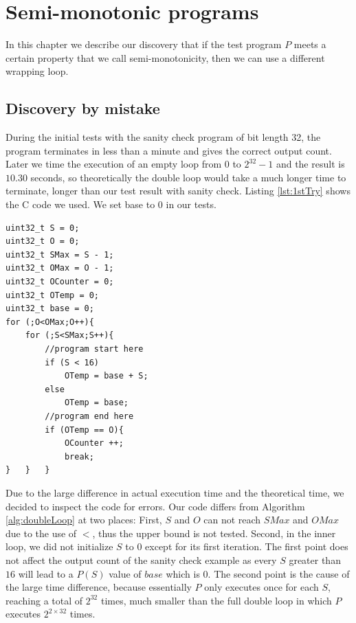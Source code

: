 
\chapter{Semi-monotonic programs}
	\label{CH_03}

In this chapter we describe our discovery that if the test program $P$ meets a certain property that we call semi-monotonicity, then we can use a different wrapping loop. 

\section{Discovery by mistake}
During the initial tests with the sanity check program of bit length 32, the program terminates in less than a minute and gives the correct output count. Later we time the execution of an empty loop from $0$ to $2^{32} - 1$ and the result is $10.30$ seconds, so theoretically the double loop would take a much longer time to terminate, longer than our test result with sanity check.  Listing \ref{lst:1stTry} shows the C code we used. We set base to 0 in our tests.

\lstset{language=C}  
\begin{lstlisting}[float=!h, caption={Initial implementation of the double loop with sanity check in C.},label=lst:1stTry]
uint32_t S = 0;
uint32_t O = 0;
uint32_t SMax = S - 1;
uint32_t OMax = O - 1;
uint32_t OCounter = 0;
uint32_t OTemp = 0;
uint32_t base = 0;
for (;O<OMax;O++){
	for (;S<SMax;S++){
		//program start here
		if (S < 16)
			OTemp = base + S;
		else
			OTemp = base;
		//program end here
		if (OTemp == O){
			OCounter ++;
			break;
}	}	}
\end{lstlisting}

Due to the large difference in actual execution time and the theoretical time, we decided to inspect the code for errors. Our code differs from Algorithm \ref{alg:doubleLoop} at two places: First, $S$ and $O$ can not reach $SMax$ and $OMax$ due to the use of $<$, thus the upper bound is not tested. Second, in the inner loop, we did not initialize $S$ to $0$ except for its first iteration. The first point does not affect the output count of the sanity check example as every $S$ greater than $16$ will lead to a $P(S)$ value of $base$ which is $0$. The second point is the cause of the large time difference, because essentially $P$ only executes once for each $S$, reaching a total of $2^{32}$ times, much smaller than the full double loop in which $P$ executes $2^{2 \times 32}$ times.

